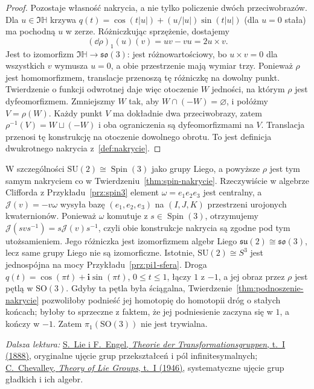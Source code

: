 \begin{proof}
Pozostaje własność nakrycia, a nie tylko policzenie
dwóch przeciwobrazów. Dla $u\in\Im\mathbb H$
krzywa $q(t)=\cos(t|u|)+(u/|u|)\sin(t|u|)$
(dla $u=0$ stała) ma pochodną $u$ w zerze.
Różniczkując sprzężenie, dostajemy
\[
 (\dd\rho)_1(u)(v)=uv-vu=2u\times v.
\]
Jest to izomorfizm $\Im\mathbb H\to
\mathfrak{so}(3)$: jest różnowartościowy, bo
$u\times v=0$ dla wszystkich $v$ wymusza $u=0$,
a obie przestrzenie mają wymiar trzy.
Ponieważ $\rho$ jest homomorfizmem, translacje
przenoszą tę różniczkę na dowolny punkt. Twierdzenie
o funkcji odwrotnej daje więc otoczenie $W$ jedności,
na którym $\rho$ jest dyfeomorfizmem. Zmniejszmy $W$
tak, aby $W\cap(-W)=\varnothing$, i połóżmy
$V=\rho(W)$. Każdy punkt $V$ ma dokładnie
dwa przeciwobrazy, zatem
$\rho^{-1}(V)=W\sqcup(-W)$ i oba ograniczenia są
dyfeomorfizmami na $V$. Translacja przenosi tę
konstrukcję na otoczenie dowolnego obrotu. To jest
definicja dwukrotnego nakrycia z~\ref{def:nakrycie}.
\end{proof}

W szczególności $\mathrm{SU}(2)\cong\operatorname{Spin}(3)$
jako grupy Liego, a powyższe $\rho$ jest tym samym
nakryciem co w Twierdzeniu~\ref{thm:spin-nakrycie}.
Rzeczywiście w algebrze Clifforda z
Przykładu~\ref{prz:spin3} element
$\omega=e_1e_2e_3$ jest centralny, a
$\mathcal J(v)=-v\omega$ wysyła bazę $(e_1,e_2,e_3)$ na
$(I,J,K)$ przestrzeni urojonych kwaternionów.
Ponieważ $\omega$ komutuje z $s\in\operatorname{Spin}(3)$,
otrzymujemy $\mathcal J(svs^{-1})=s\mathcal J(v)s^{-1}$, czyli obie
konstrukcje nakrycia są zgodne pod tym utożsamieniem.
Jego różniczka jest izomorfizmem algebr Liego
$\mathfrak{su}(2)\cong\mathfrak{so}(3)$, lecz same grupy
Liego nie są izomorficzne. Istotnie,
$\mathrm{SU}(2)\cong S^3$ jest jednospójna na mocy
Przykładu~\ref{prz:pi1-sfera}. Droga
$q(t)=\cos(\pi t)+\mathbf i\sin(\pi t)$, $0\leq t\leq1$,
łączy $1$ z $-1$, a jej obraz przez $\rho$ jest pętlą
w $\mathrm{SO}(3)$. Gdyby ta pętla była ściągalna,
Twierdzenie~\ref{thm:podnoszenie-nakrycie} pozwoliłoby
podnieść jej homotopię do homotopii dróg o stałych
końcach; byłoby to sprzeczne z faktem, że jej podniesienie
zaczyna się w $1$, a kończy w $-1$.
Zatem $\pi_1(\mathrm{SO}(3))$ nie jest trywialna.

\par\smallskip
{\footnotesize\noindent\emph{Dalsza lektura:}
\href{https://archive.org/download/theotransformation01liesrich/theotransformation01liesrich.pdf}
{S.\ Lie i F.\ Engel, \emph{Theorie der Transformationsgruppen},
t.~I (1888)}, oryginalne ujęcie grup przekształceń i pól
infinitesymalnych;
\href{https://books.google.com/books/about/Theory_of_Lie_Groups_I.html?id=bm4GAQAAIAAJ}
{C.\ Chevalley, \emph{Theory of Lie Groups}, t.~I (1946)},
systematyczne ujęcie grup gładkich i ich algebr.\par}
